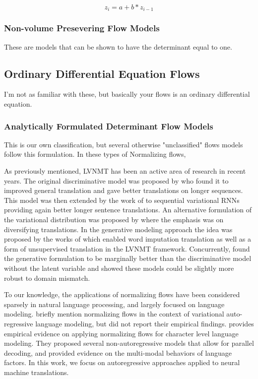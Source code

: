 \begin{equation}
	 z_{i} = a + b * z_{i-1}		
\end{equation}

\subsubsection{Non-volume Presevering Flow Models} 
These are models that can be shown to have the determinant equal to one. 

\subsection{Ordinary Differential Equation Flows}

I'm not as familiar with these, but basically your flows is an ordinary differential equation. 

\subsubsection{Analytically Formulated Determinant Flow Models}
This is our own classification, but several otherwise "unclassified" flows models follow this formulation. In these types of Normalizing flows,


As previously mentioned, \ac{LVNMT} has been an active area of research in recent years. The original discriminative model was proposed by \citet{Zhang2016VNMT} who found it to improved general translation and gave better translations on longer sequences. This model was then extended by the work of \citet{Su2018VRNMT} to sequential variational \ac{RNN}s providing again better longer sentence translations. An alternative formulation of the variational distribution was proposed by \citet{schulz2018StochasticDecoder} where the emphasis was on diversifying translations. In the generative modeling approach the idea was proposed by the works of \citet{harshil2018GNMT} which enabled word imputation translation as well as a form of unsupervised translation in the \ac{LVNMT} framework. Concurrently, \citet{eikema2018AEVNMT} found the generative formulation to be marginally better than the discriminative model without the latent variable and showed these models could be slightly more robust to domain mismatch. 

To our knowledge, the applications of normalizing flows have been considered sparsely in natural language processing, and largely focused on language modeling. \citet{bowman2015GeneratingSent} briefly mention normalizing flows in the context of variational auto-regressive language modeling, but did not report their empirical findings. \citet{ziegler2019LatentNFforDiscrete} provides empirical evidence on applying normalizing flows for character level language modeling. They proposed several non-autoregressive models that allow for parallel decoding, and provided evidence on the multi-modal behaviors of language factors. In this work, we focus on autoregressive approaches applied to neural machine translations.

